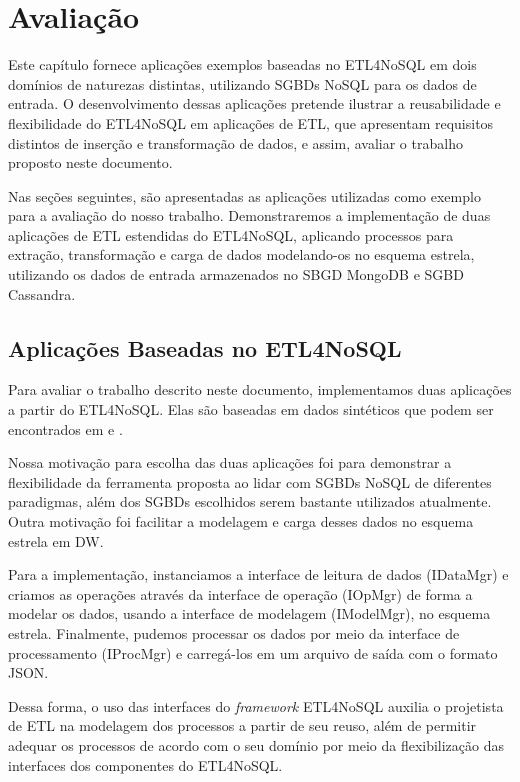 \chapter{Avaliação}

Este capítulo fornece aplicações exemplos baseadas no ETL4NoSQL em dois domínios de naturezas distintas, utilizando SGBDs NoSQL para os dados de entrada. O desenvolvimento dessas aplicações pretende ilustrar a reusabilidade e flexibilidade do ETL4NoSQL em aplicações de ETL, que apresentam requisitos distintos de inserção e transformação de dados, e assim, avaliar o trabalho proposto neste documento.

Nas seções seguintes, são apresentadas as aplicações utilizadas como exemplo para a avaliação do nosso trabalho. Demonstraremos a implementação de duas aplicações de ETL estendidas do ETL4NoSQL, aplicando processos para extração, transformação e carga de dados modelando-os no esquema estrela, utilizando os dados de entrada armazenados no SBGD MongoDB e SGBD Cassandra.

\clearpage	

\section{Aplicações Baseadas no ETL4NoSQL}

Para avaliar o trabalho descrito neste documento, implementamos duas aplicações a partir do ETL4NoSQL. Elas são baseadas em dados sintéticos que podem ser encontrados em \cite{dataMongo} e \cite{dataCassandra}. 

Nossa motivação para escolha das duas aplicações foi para demonstrar a flexibilidade da ferramenta proposta ao lidar com SGBDs NoSQL de diferentes paradigmas, além dos SGBDs escolhidos serem bastante utilizados atualmente. Outra motivação foi facilitar a modelagem e carga desses dados no esquema estrela em DW.

Para a implementação, instanciamos a interface de leitura de dados (IDataMgr) e criamos as operações através da interface de operação (IOpMgr) de forma a modelar os dados, usando a interface de modelagem (IModelMgr), no esquema estrela. Finalmente, pudemos processar os dados por meio da interface de processamento (IProcMgr) e carregá-los em um arquivo de saída com o formato JSON.

Dessa forma, o uso das interfaces do \textit{framework} ETL4NoSQL auxilia o projetista de ETL na modelagem dos processos a partir de seu reuso, além de permitir adequar os processos de acordo com o seu domínio por meio da flexibilização das interfaces dos componentes do ETL4NoSQL.

